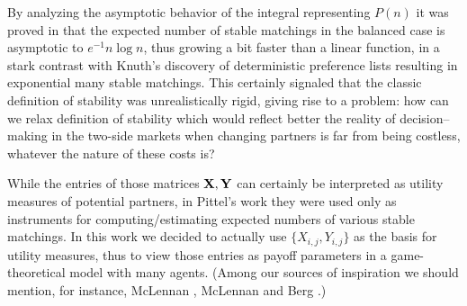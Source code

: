 \documentclass[11pt]{amsart}
\theoremstyle{remark}
\numberwithin{equation}{section}
\begin{document}
By analyzing the asymptotic behavior of the integral representing $P(n)$ it was proved in \cite{Pit1} that the expected number of stable matchings in the balanced case is asymptotic to $e^{-1}n\log n$, thus growing a bit faster than a linear function, in a stark contrast with Knuth's discovery of deterministic preference lists resulting in exponential many stable matchings. This certainly signaled that the classic definition of stability was unrealistically rigid, giving rise to a problem: how can we relax definition of stability which would reflect better the reality of decision--making in the two-side markets when changing partners is far from being costless, whatever the nature of these costs is?

While the entries of those matrices $\bold X, \bold Y$ can certainly be interpreted as utility measures of potential partners,
in Pittel's work they were used only as instruments for computing/estimating expected numbers of various stable matchings. 
In this work we decided to actually use  $\{X_{i,j}, Y_{i,j}\}$ as the basis for utility measures, thus to view those entries as payoff parameters in a game-theoretical model with many agents. (Among our sources of inspiration we should mention,
for instance, McLennan \cite{McL}, McLennan and Berg \cite{McB}.) 
\end{document}
